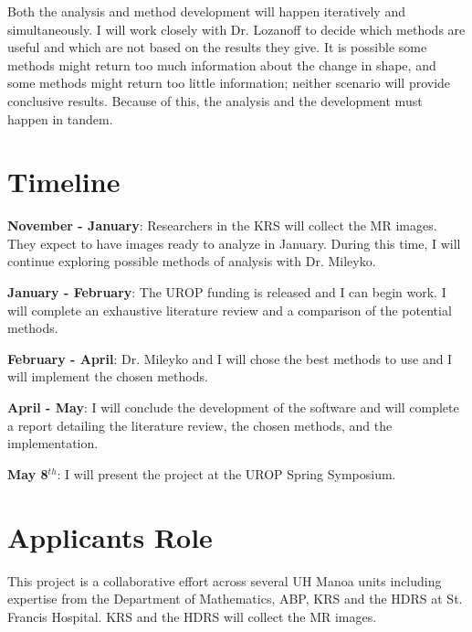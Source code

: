 \documentclass[ letterpaper, 12 pt, conference]{ieeeconf}  %
\begin{document}
Both the analysis and method development will happen iteratively and simultaneously.  I will work closely with Dr. Lozanoff to decide which methods are useful and which are not based on the results they give.  It is possible some methods might return too much information about the change in shape, and some methods might return too little information; neither scenario will provide conclusive results.  Because of this, the analysis and the development must happen in tandem.  


\section{Timeline}

{\bf November - January}:  Researchers in the \ac{KRS} will collect the MR images.  They expect to have images ready to analyze in January.  During this time, I will continue exploring possible methods of analysis with Dr. Mileyko. 

{\bf January - February}:  The UROP funding is released and I can begin work.  I will complete an exhaustive literature review and a comparison of the potential methods.

{\bf February - April}:  Dr. Mileyko and I will chose the best methods to use and I will implement the chosen methods.

{\bf April - May}:  I will conclude the development of the software and will complete a report detailing the literature review, the chosen methods, and the implementation.

{\bf May 8$^{th}$}: I will present the project at the UROP Spring Symposium.


\section{Applicants Role}

This project is a collaborative effort across several UH Manoa units including expertise from the Department of Mathematics, \ac{ABP}, \ac{KRS} and the \ac{HDRS} at St. Francis Hospital.   \ac{KRS} and the \ac{HDRS} will collect the MR images. 
\end{document}
